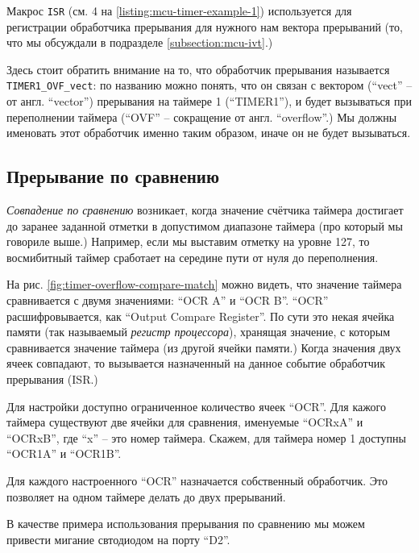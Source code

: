 \documentclass[../sparc.tex]{subfiles}
\begin{document}
Макрос \texttt{ISR} (см. 4 на \ref{listing:mcu-timer-example-1})
используется для регистрации обработчика прерывания для нужного нам вектора
прерываний (то, что мы обсуждали в подразделе \ref{subsection:mcu-ivt}.)

Здесь стоит обратить внимание на то, что обработчик прерывания называется
\texttt{TIMER1_OVF_vect}: по названию можно понять, что он связан с
вектором (``vect'' -- от англ. ``vector'') прерывания на таймере 1 (``TIMER1''),
и будет вызываться при переполнении таймера (``OVF'' -- сокращение от англ.
``overflow''.)  Мы должны именовать этот обработчик именно таким образом, иначе
он не будет вызываться.

\subsection{Прерывание по сравнению}
\label{subsection:ocr}


\emph{Совпадение по сравнению} возникает, когда значение счётчика таймера
достигает до заранее заданной отметки в допустимом диапазоне таймера (про
который мы говориле выше.)  Например, если мы выставим отметку на уровне 127, то
восмибитный таймер сработает на середине пути от нуля до переполнения.


На рис. \ref{fig:timer-overflow-compare-match} можно видеть, что значение
таймера сравнивается с двумя значениями: ``OCR A'' и ``OCR B''. ``OCR''
расшифровывается, как ``Output Compare Register''.  По сути это некая ячейка
памяти (так называемый \emph{регистр процессора}), хранящая значение, с которым
сравнивается значение таймера (из другой ячейки памяти.)  Когда значения двух
ячеек совпадают, то вызывается назначенный на данное событие обработчик
прерывания (\gls{ISR}.)

Для настройки доступно ограниченное количество ячеек ``OCR''.  Для кажого
таймера существуют две ячейки для сравнения, именуемые ``OCRxA'' и ``OCRxB'',
где ``x'' -- это номер таймера.  Скажем, для таймера номер 1 доступны ``OCR1A'' и
``OCR1B''.

Для каждого настроенного ``OCR'' назначается собственный обработчик.  Это
позволяет на одном таймере делать до двух прерываний.

В качестве примера использования прерывания по сравнению мы можем привести
мигание свтодиодом на порту ``D2''.
\end{document}
